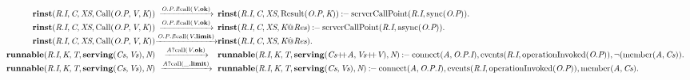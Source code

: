 \[
\begin{array}{r@{}c@{}l}
\\\Prule{\Tstep{\Trinst{\Tr{\Tvar{R}}{\Tvar{I}}}{\Tvar{C}}{\Tvar{XS}}{\TrteCall{\To{\Tvar{O}}{\Tvar{P}}}{\Tvar{V}}{\Tvar{K}}}}{\Tsay{\Top{\Tvar{O}}{\Tvar{P}}{\Tvar{I}}}{\Tcall{\Tvar{V}}{\Tatom{ok}}}}{\Trinst{\Tr{\Tvar{R}}{\Tvar{I}}}{\Tvar{C}}{\Tvar{XS}}{\TrteResult{\To{\Tvar{O}}{\Tvar{P}}}{\Tvar{K}}}}}{\TserverCallPoint{\Tr{\Tvar{R}}{\Tvar{I}}}{\Tsync{\To{\Tvar{O}}{\Tvar{P}}}}}.
\\\Prule{\Tstep{\Trinst{\Tr{\Tvar{R}}{\Tvar{I}}}{\Tvar{C}}{\Tvar{XS}}{\TrteCall{\To{\Tvar{O}}{\Tvar{P}}}{\Tvar{V}}{\Tvar{K}}}}{\Tsay{\Top{\Tvar{O}}{\Tvar{P}}{\Tvar{I}}}{\Tcall{\Tvar{V}}{\Tatom{ok}}}}{\Trinst{\Tr{\Tvar{R}}{\Tvar{I}}}{\Tvar{C}}{\Tvar{XS}}{\Tap{\Tvar{K}}{\Tvar{Res}}}}}{\TserverCallPoint{\Tr{\Tvar{R}}{\Tvar{I}}}{\Tasync{\To{\Tvar{O}}{\Tvar{P}}}}}.
\\\Pfact{\Tstep{\Trinst{\Tr{\Tvar{R}}{\Tvar{I}}}{\Tvar{C}}{\Tvar{XS}}{\TrteCall{\To{\Tvar{O}}{\Tvar{P}}}{\Tvar{V}}{\Tvar{K}}}}{\Tsay{\Top{\Tvar{O}}{\Tvar{P}}{\Tvar{I}}}{\Tcall{\Tvar{V}}{\Tatom{limit}}}}{\Trinst{\Tr{\Tvar{R}}{\Tvar{I}}}{\Tvar{C}}{\Tvar{XS}}{\Tap{\Tvar{K}}{\Tvar{Res}}}}}.
\\\Prule{\Tstep{\Trunnable{\Tr{\Tvar{R}}{\Tvar{I}}}{\Tvar{K}}{\Tvar{T}}{\Tserving{\Tvar{Cs}}{\Tvar{Vs}}}{\Tvar{N}}}{\Thear{\Tvar{A}}{\Tcall{\Tvar{V}}{\Tatom{ok}}}}{\Trunnable{\Tr{\Tvar{R}}{\Tvar{I}}}{\Tvar{K}}{\Tvar{T}}{\Tserving{\Tseq{\Tvar{Cs}}{\Tvar{A}}}{\Tseq{\Tvar{Vs}}{\Tvar{V}}}}{\Tvar{N}}}}{\Tconnect{\Tvar{A}}{\Top{\Tvar{O}}{\Tvar{P}}{\Tvar{I}}},\Tevents{\Tr{\Tvar{R}}{\Tvar{I}}}{\ToperationInvoked{\To{\Tvar{O}}{\Tvar{P}}}},\Pnegate{\Tmember{\Tvar{A}}{\Tvar{Cs}}}}.
\\\Prule{\Tstep{\Trunnable{\Tr{\Tvar{R}}{\Tvar{I}}}{\Tvar{K}}{\Tvar{T}}{\Tserving{\Tvar{Cs}}{\Tvar{Vs}}}{\Tvar{N}}}{\Thear{\Tvar{A}}{\Tcall{\_}{\Tatom{limit}}}}{\Trunnable{\Tr{\Tvar{R}}{\Tvar{I}}}{\Tvar{K}}{\Tvar{T}}{\Tserving{\Tvar{Cs}}{\Tvar{Vs}}}{\Tvar{N}}}}{\Tconnect{\Tvar{A}}{\Top{\Tvar{O}}{\Tvar{P}}{\Tvar{I}}},\Tevents{\Tr{\Tvar{R}}{\Tvar{I}}}{\ToperationInvoked{\To{\Tvar{O}}{\Tvar{P}}}},\Tmember{\Tvar{A}}{\Tvar{Cs}}}.
\end{array}
\]
